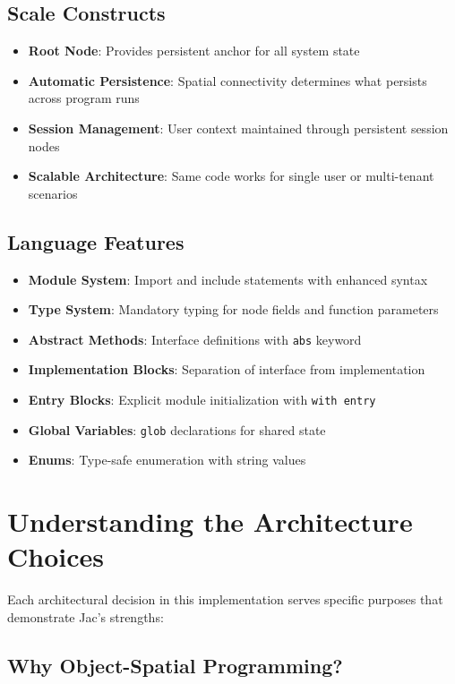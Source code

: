 \subsection{Scale Constructs}
\begin{itemize}
    \item \textbf{Root Node}: Provides persistent anchor for all system state
    \item \textbf{Automatic Persistence}: Spatial connectivity determines what persists across program runs
    \item \textbf{Session Management}: User context maintained through persistent session nodes
    \item \textbf{Scalable Architecture}: Same code works for single user or multi-tenant scenarios
\end{itemize}

\subsection{Language Features}
\begin{itemize}
    \item \textbf{Module System}: Import and include statements with enhanced syntax
    \item \textbf{Type System}: Mandatory typing for node fields and function parameters
    \item \textbf{Abstract Methods}: Interface definitions with \texttt{abs} keyword
    \item \textbf{Implementation Blocks}: Separation of interface from implementation
    \item \textbf{Entry Blocks}: Explicit module initialization with \texttt{with entry}
    \item \textbf{Global Variables}: \texttt{glob} declarations for shared state
    \item \textbf{Enums}: Type-safe enumeration with string values
\end{itemize}

\section{Understanding the Architecture Choices}

Each architectural decision in this implementation serves specific purposes that demonstrate Jac's strengths:

\subsection{Why Object-Spatial Programming?}

